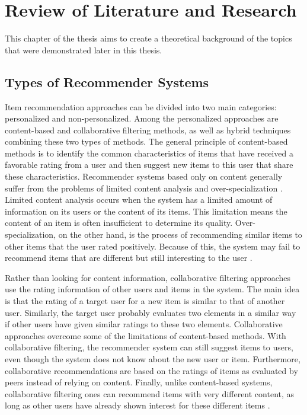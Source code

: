 
\chapter{Review of Literature and Research}\label{chapter:review_of_research}

This chapter of the thesis aims to create a theoretical background of the topics that were demonstrated later in this thesis.

\section{Types of Recommender Systems}

Item recommendation approaches can be divided into two main categories: personalized and non-personalized. Among the personalized approaches are content-based and collaborative filtering methods, as well as hybrid techniques combining these two types of methods. The general principle of content-based methods is to identify the common characteristics of items that have received a favorable rating from a user and then suggest new items to this user that share these characteristics. Recommender systems based only on content generally suffer from the problems of limited content analysis and over-specialization \cite{shardanand1995social}. Limited content analysis occurs when the system has a limited amount of information on its users or the content of its items. This limitation means the content of an item is often insufficient to determine its quality. Over-specialization, on the other hand, is the process of recommending similar items to other items that the user rated positively. Because of this, the system may fail to recommend items that are different but still interesting to the user \cite{desrosiers2011comprehensive}.


Rather than looking for content information, collaborative filtering approaches use the rating information of other users and items in the system. The main idea is that the rating of a target user for a new item is similar to that of another user. Similarly, the target user probably evaluates two elements in a similar way if other users have given similar ratings to these two elements. Collaborative approaches overcome some of the limitations of content-based methods. With collaborative filtering, the recommender system can still suggest items to users, even though the system does not know about the new user or item. Furthermore, collaborative recommendations are based on the ratings of items as evaluated by peers instead of relying on content. Finally, unlike content-based systems, collaborative filtering ones can recommend items with very different content, as long as other users have already shown interest for these different items \cite{desrosiers2011comprehensive}.

